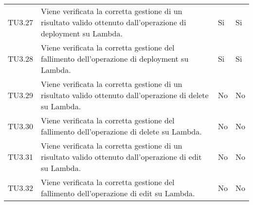 \begin{longtable}{
		>{\centering}p{}
		>{}p{}
		>{\centering}p{}
		>{\centering}p{} }
TU3.27 & Viene verificata la corretta gestione di un risultato valido ottenuto dall'operazione di deployment su Lambda. & Si & Si \tabularnewline

TU3.28 & Viene verificata la corretta gestione del fallimento dell'operazione di deployment su Lambda. & Si & Si \tabularnewline

TU3.29 & Viene verificata la corretta gestione di un risultato valido ottenuto dall'operazione di delete su Lambda. & No & No \tabularnewline

TU3.30 & Viene verificata la corretta gestione del fallimento dell'operazione di delete su Lambda. & No & No \tabularnewline

TU3.31 & Viene verificata la corretta gestione di un risultato valido ottenuto dall'operazione di edit su Lambda. & No & No \tabularnewline

TU3.32 & Viene verificata la corretta gestione del fallimento dell'operazione di edit su Lambda. & No & No \tabularnewline


\end{longtable}

